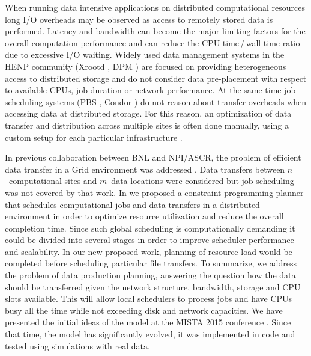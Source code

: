 \documentclass{svjour3}                     %
\begin{document}
When running data intensive applications on distributed computational
resources long I/O overheads may be observed as access to remotely stored data
is performed. Latency and bandwidth can become the major limiting factors for
the overall computation performance and can reduce the CPU time\,/\,wall time 
ratio due to excessive I/O waiting. 
Widely used data management systems in the HENP community
(Xrootd \cite{Xrootd}, DPM \cite{DPM}) are focused on providing heterogeneous access to distributed
storage and do not consider data pre-placement with respect to available CPUs,
job duration or network performance. At the same time job scheduling systems
(PBS \cite{PBS}, Condor \cite{Torque}) do not reason about transfer overheads when accessing data at
distributed storage. For this reason, an optimization of data transfer and
distribution across multiple sites is often done manually, using a custom
setup for each particular infrastructure \cite{Balewski}. 

In previous collaboration between BNL and NPI/ASCR, the problem of
efficient data transfer in a Grid environment was addressed \cite{Zerola}.
Data transfers between $n$~computational sites and $m$~data locations were
considered but job scheduling was not covered
by that work. In \cite{ACAT_cp} we
proposed a constraint programming planner that schedules computational jobs
and data transfers in a distributed environment in order to optimize resource
utilization and reduce the overall completion time. Since such global
scheduling is computationally demanding it could be divided into several
stages in order to improve scheduler performance and scalability. In our new proposed work, planning of resource load would be completed before scheduling particular file transfers. To summarize, we address the problem of data production
planning, answering the question how the data should be transferred given the
network structure, bandwidth, storage and CPU slots available. This will allow
local schedulers to process jobs and have CPUs busy all the time while not
exceeding disk and network capacities. 
We have presented the initial ideas of the model at the MISTA 2015 conference \cite{MISTA}. Since that time, the model has significantly evolved, it was implemented in code and tested using simulations with real data. 
\end{document}
